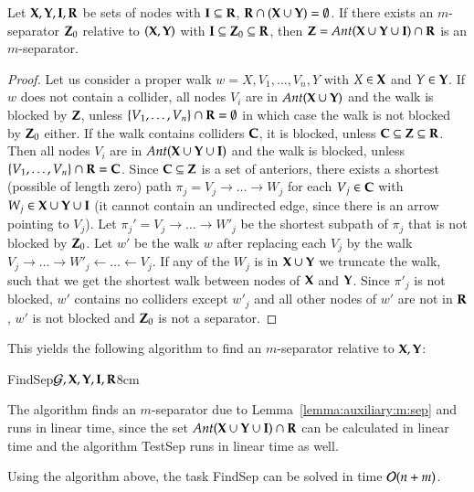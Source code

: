 \begin{lemma}\label{lemma:auxiliary:m:sep}
Let ${\bf X}, {\bf Y}, {\bf I}, {\bf R}$  be sets of nodes with 
${\bf I} \subseteq {\bf R}$, ${\bf R} \cap ({\bf X} \cup {\bf Y}) = \emptyset$. 
If there exists an $m$-separator ${\bf Z}_0$ relative to $({\bf X},{\bf Y})$ with 
${\bf I} \subseteq {\bf Z}_0 \subseteq {\bf R}$, then ${\bf Z} = \textit{Ant}({\bf X} \cup {\bf Y} \cup {\bf I}) \cap {\bf R}  $ 
is an $m$-separator.
\end{lemma}
\begin{proof}
%
Let us consider a proper walk 
$w = X , V_1, \ldots, V_{n} , Y$ with 
$X \in {\bf X}$ and $Y \in {\bf Y}$. If $w$ 
does not contain a collider, all nodes $V_i$ 
are in $\textit{Ant}({\bf X} \cup {\bf Y})$ and the walk is blocked
by $\bZ$, unless $\{V_1,\ldots, V_n\} \cap {\bf R} = \emptyset$
in which case the walk is not  blocked by ${\bf Z}_0$ either.
If the walk contains colliders ${\bf C}$, it is
blocked, unless ${\bf C} \subseteq {\bf Z} \subseteq {\bf R}$.
Then all nodes $V_i$ are in $\textit{Ant}({\bf X} \cup {\bf Y} \cup {\bf I})$ 
and the walk is blocked, unless $\{V_1,\ldots, V_n\}\cap {\bf R} = {\bf C} $.
Since ${\bf C} \subseteq {\bf Z}$ is a set of anteriors,
there exists a shortest (possible of length zero) %
path $\pi_j = V_j \to \ldots \to W_j$ for 
each $V_j \in {\bf C}$ with $W_j \in {\bf X} \cup {\bf Y} \cup {\bf I}$ 
(it cannot contain an undirected  edge, since there is an arrow
pointing to $V_j$). Let $\pi_j' = V_j \to \ldots \to W'_j$
be the shortest subpath of $\pi_j$ that is not blocked
by ${\bf Z}_0$. Let $w'$ be  the walk $w$ after replacing
each $V_j$ by the walk 
$V_j \to \ldots \to W'_j \gets \ldots \gets V_j$. 
If any of the $W_j$ is in ${\bf X} \cup {\bf Y}$ we truncate 
the walk, such that we get the shortest walk between 
nodes of ${\bf X}$ and ${\bf Y}$. Since $\pi'_j$ is not blocked, 
$w'$ contains no colliders except $w'_j$ and all
other nodes of $w'$ are not in ${\bf R}$, $w'$ is not blocked
and ${\bf Z}_0$ is not a separator.   
\end{proof}

This yields the following algorithm to find an $m$-separator relative to ${\bf X},{\bf Y}$:

\begin{algo}{FindSep}{${\cal G}, {\bf X}, {\bf Y}, {\bf I}, {\bf R}$}{\label{algo:findsep}}{8cm}
{\Return{$\bZ$}}
\Else
{ \Return{$\bot$}}
\EndIf
\end{algo}
\begin{analal}
The algorithm finds an $ m $-separator due to Lemma~\ref{lemma:auxiliary:m:sep} and runs in linear time, since the set $\textit{Ant}({\bf X} \cup {\bf Y} \cup {\bf I}) \cap {\bf R}$  can be calculated in linear time
and the algorithm {\sc TestSep} runs in linear time as well.
%
%
%
%
%
\end{analal} 
\begin{proposition}%
\label{prop:FindSep}
Using the algorithm above, the task {\sc FindSep} can be solved in 
time ${\cal O}(n+m)$. 
\end{proposition}

